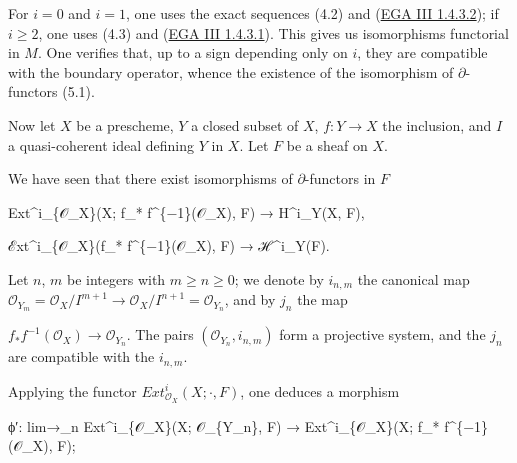 \documentclass[
  11pt,
  a4paper,
]{book}
\newenvironment{Shaded}{}{}
\newcommand{\NormalTok}[1]{#1}
\begin{document}
For \(i = 0\) and \(i = 1\), one uses the exact sequences (4.2) and
(\href{https://jcreinhold.github.io/ega/iii/08-ch3-01-cohomology-affine-schemes.html\#14-application-to-the-cohomology-of-arbitrary-preschemes}{EGA
III 1.4.3.2}); if \(i \geqslant 2\), one uses (4.3) and
(\href{https://jcreinhold.github.io/ega/iii/08-ch3-01-cohomology-affine-schemes.html\#14-application-to-the-cohomology-of-arbitrary-preschemes}{EGA
III 1.4.3.1}). This gives us isomorphisms functorial in \(M\). One
verifies that, up to a sign depending only on \(i\), they are compatible
with the boundary operator, whence the existence of the isomorphism of
\(\partial\)-functors (5.1).

Now let \(X\) be a prescheme, \(Y\) a closed subset of \(X\),
\(f: Y \to X\) the inclusion, and \(I\) a quasi-coherent ideal defining
\(Y\) in \(X\). Let \(F\) be a sheaf on \(X\).

We have seen that there exist isomorphisms of \(\partial\)-functors in
\(F\)

\begin{Shaded}
\begin{Highlighting}[]
\NormalTok{Ext\^{}i\_\{𝒪\_X\}(X; f\_* f\^{}\{−1\}(𝒪\_X), F) → H\^{}i\_Y(X, F),}
\end{Highlighting}
\end{Shaded}

\begin{Shaded}
\begin{Highlighting}[]
\NormalTok{ℰxt\^{}i\_\{𝒪\_X\}(f\_* f\^{}\{−1\}(𝒪\_X), F) → ℋ\^{}i\_Y(F).}
\end{Highlighting}
\end{Shaded}

Let \(n\), \(m\) be integers with \(m \geqslant n \geqslant 0\); we
denote by \(i_{n,m}\) the canonical map \(\mathcal{O}_{Y_{m}}
= \mathcal{O}_{X}/I^{m+1} \to \mathcal{O}_{X}/I^{n+1} = \mathcal{O}_{Y_{n}}\),
and by \(j_{n}\) the map

\(f_{*} f^{-1}(\mathcal{O}_{X}) \to \mathcal{O}_{Y_{n}}\). The pairs
\((\mathcal{O}_{Y_{n}}, i_{n,m})\) form a projective system, and the
\(j_{n}\) are compatible with the \(i_{n,m}\).

Applying the functor \(Ext^{i}_{\mathcal{O}_{X}}(X; \cdot, F)\), one
deduces a morphism

\begin{Shaded}
\begin{Highlighting}[]
\NormalTok{ϕ′: lim→\_n Ext\^{}i\_\{𝒪\_X\}(X; 𝒪\_\{Y\_n\}, F) → Ext\^{}i\_\{𝒪\_X\}(X; f\_* f\^{}\{−1\}(𝒪\_X), F);}
\end{Highlighting}
\end{Shaded}
\end{document}
